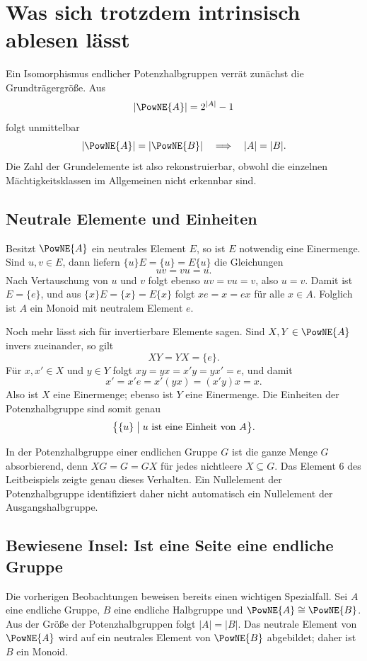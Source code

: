 \documentclass[main.tex]{subfiles}
\begin{document}
\section{Was sich trotzdem intrinsisch ablesen lässt}

Ein Isomorphismus endlicher Potenzhalbgruppen verrät zunächst die
Grundträgergröße.  Aus
\[
  |\PowNE{A}|=2^{|A|}-1
\]
folgt unmittelbar
\[
  |\PowNE{A}|=|\PowNE{B}|
  \quad\Longrightarrow\quad
  |A|=|B|.
\]
Die Zahl der Grundelemente ist also rekonstruierbar, obwohl die einzelnen
Mächtigkeitsklassen im Allgemeinen nicht erkennbar sind.

\subsection{Neutrale Elemente und Einheiten}

Besitzt \(\PowNE{A}\) ein neutrales Element \(E\), so ist \(E\) notwendig
eine Einermenge.  Sind \(u,v\in E\), dann liefern
\(\{u\}E=\{u\}=E\{u\}\) die Gleichungen
\[
  uv=vu=u.
\]
Nach Vertauschung von \(u\) und \(v\) folgt ebenso \(uv=vu=v\), also
\(u=v\).  Damit ist \(E=\{e\}\), und aus
\(\{x\}E=\{x\}=E\{x\}\) folgt \(xe=x=ex\) für alle \(x\in A\).
Folglich ist \(A\) ein Monoid mit neutralem Element \(e\).

Noch mehr lässt sich für invertierbare Elemente sagen.  Sind
\(X,Y\in\PowNE{A}\) invers zueinander, so gilt
\[
  XY=YX=\{e\}.
\]
Für \(x,x'\in X\) und \(y\in Y\) folgt \(xy=yx=x'y=yx'=e\), und damit
\[
  x'=x'e=x'(yx)=(x'y)x=x.
\]
Also ist \(X\) eine Einermenge; ebenso ist \(Y\) eine Einermenge.  Die
Einheiten der Potenzhalbgruppe sind somit genau
\[
  \bigl\{\{u\}\bigm|u\text{ ist eine Einheit von }A\bigr\}.
\]

\begin{remark}
In der Potenzhalbgruppe einer endlichen Gruppe \(G\) ist die ganze Menge
\(G\) absorbierend, denn \(XG=G=GX\) für jedes nichtleere \(X\subseteq G\).
Das Element \(6\) des Leitbeispiels zeigte genau dieses Verhalten.  Ein
Nullelement der Potenzhalbgruppe identifiziert daher nicht automatisch ein
Nullelement der Ausgangshalbgruppe.
\end{remark}

\subsection{Bewiesene Insel: Ist eine Seite eine endliche Gruppe}

Die vorherigen Beobachtungen beweisen bereits einen wichtigen Spezialfall.
Sei \(A\) eine endliche Gruppe, \(B\) eine endliche Halbgruppe und
\(\PowNE{A}\cong\PowNE{B}\).  Aus der Größe der Potenzhalbgruppen folgt
\(|A|=|B|\).  Das neutrale Element von \(\PowNE{A}\) wird auf ein neutrales
Element von \(\PowNE{B}\) abgebildet; daher ist \(B\) ein Monoid.
\end{document}
